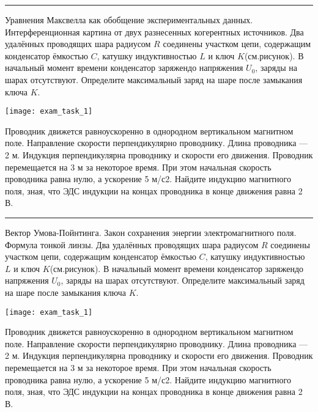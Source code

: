 \documentclass[a5paper, landscape]{exam}
\begin{document}
\newpage
\rule{1\textwidth}{0.4pt}
\begin{questions}
\question Уравнения Максвелла как обобщение экспериментальных данных. 
\question Интерференционная картина от двух разнесенных когерентных источников.
\question Два удалённых проводящих шара радиусом $R$ соединены участком цепи, содержащим конденсатор ёмкостью $C$, катушку индуктивностью $L$ и ключ $K$(см.рисунок). В начальный момент времени конденсатор заряжендо напряжения $U_0$, заряды на шарах отсутствуют. Определите максимальный заряд на шаре после замыкания ключа $K$.

\texttt{[image: exam\_task\_1]}


\question Проводник движется равноускоренно в однородном вертикальном магнитном поле. Направление скорости перпендикулярно проводнику. Длина проводника — 2 м. Индукция перпендикулярна проводнику и скорости его движения. Проводник перемещается на 3 м за некоторое время. При этом начальная скорость проводника равна нулю, а ускорение 5 м/с2. Найдите индукцию магнитного поля, зная, что ЭДС индукции на концах проводника в конце движения равна 2 В.
\end{questions}


\newpage

\rule{1\textwidth}{0.4pt}
\begin{questions}
\question Вектор Умова-Пойнтинга. Закон сохранения энергии электромагнитного поля.
\question Формула тонкой линзы.
\question Два удалённых проводящих шара радиусом $R$ соединены участком цепи, содержащим конденсатор ёмкостью $C$, катушку индуктивностью $L$ и ключ $K$(см.рисунок). В начальный момент времени конденсатор заряжендо напряжения $U_0$, заряды на шарах отсутствуют. Определите максимальный заряд на шаре после замыкания ключа $K$.

\texttt{[image: exam\_task\_1]}


\question Проводник движется равноускоренно в однородном вертикальном магнитном поле. Направление скорости перпендикулярно проводнику. Длина проводника — 2 м. Индукция перпендикулярна проводнику и скорости его движения. Проводник перемещается на 3 м за некоторое время. При этом начальная скорость проводника равна нулю, а ускорение 5 м/с2. Найдите индукцию магнитного поля, зная, что ЭДС индукции на концах проводника в конце движения равна 2 В.
\end{questions}


\newpage
\end{document}

